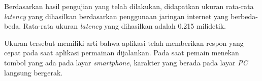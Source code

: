 \begin{enumerate}
	Berdasarkan hasil pengujian yang telah dilakukan, didapatkan ukuran rata-rata \textit{latency} yang dihasilkan berdasarkan penggunaan jaringan internet yang berbeda-beda. Rata-rata ukuran \textit{latency} yang dihasilkan adalah 0.215 milidetik.
	
	Ukuran tersebut memiliki arti bahwa aplikasi telah memberikan respon yang cepat pada saat aplikasi permainan dijalankan. Pada saat pemain menekan tombol yang ada pada layar \textit{smartphone}, karakter yang berada pada layar \textit{PC} langsung bergerak.
	
%		
	
	
	

\end{enumerate}
